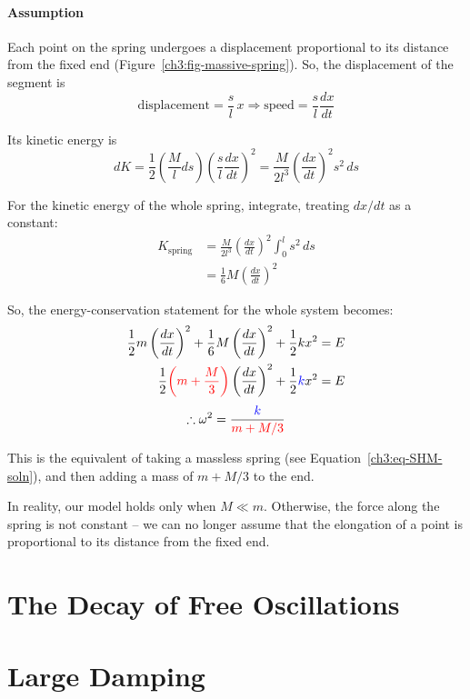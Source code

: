 \documentclass[11pt,letterpaper,titlepage,oneside]{book}
\newcommand{\kcol}[1]{\textcolor{blue}{#1}}
\newcommand{\mcol}[1]{\textcolor{red}{#1}}
\begin{document}
\paragraph{Assumption} Each point on the spring undergoes a displacement proportional to its distance from the fixed end (Figure~\ref{ch3:fig-massive-spring}). So, the displacement of the segment is
\[ \text{displacement} = \frac{s}{l} \, x \Longrightarrow
\text{speed} = \frac{s}{l} \frac{dx}{dt} 
\]

Its kinetic energy is \[ dK = \frac{1}{2}\left( \frac{M}{l} ds \right) \left( \frac{s}{l} \frac{dx}{dt} \right)^2 = \frac{M}{2l^3} \left( \frac{dx}{dt} \right)^2 s^2 \, ds \]

For the kinetic energy of the whole spring, integrate, treating $dx/dt$ as a constant:
\begin{align*}
K_\text{spring} &= \frac{M}{2l^3} \left( \frac{dx}{dt} \right)^2  \int_0^{l} s^2 \, ds \\
&= \frac{1}{6}M\left(\frac{dx}{dt}\right)^2
\end{align*}

So, the energy-conservation statement for the whole system becomes:
\begin{align*}
\frac{1}{2}m\left(\frac{dx}{dt}\right)^2 + \frac{1}{6}M\left( \frac{dx}{dt}\right)^2 + \frac{1}{2}kx^2 &= E  \\
\frac{1}{2} \mcol{\left( m + \frac{M}{3} \right)} \left(\frac{dx}{dt}\right)^2 + \frac{1}{2} \kcol{k} x^2 &= E
\end{align*}
\[ \therefore \omega^2 = \frac{\kcol{k}}{\mcol{m+M/3}} \]

This is the equivalent of taking a massless spring (see Equation~\ref{ch3:eq-SHM-soln}), and then adding a mass of $m + M/3$ to the end.

In reality, our model holds only when $M \ll m$. Otherwise, the force along the spring is not constant -- we can no longer assume that the elongation of a point is proportional to its distance from the fixed end.

\section{The Decay of Free Oscillations}

\section{Large Damping}

\end{document}
